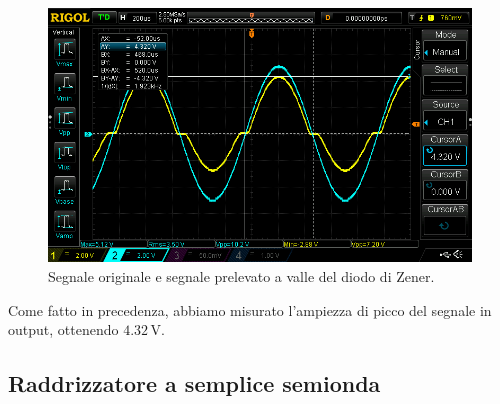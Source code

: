 \documentclass[a4paper]{article}
\begin{document}
				\begin{figure}[h!]
					\centering
					\includegraphics[scale=0.5]{ampiezzaDiPiccoDiodoDiZener}
					\caption{Segnale originale e segnale prelevato a valle del diodo di Zener.}
					\label{fig:ampiezzaDiPiccoDiodoDiZener}
				\end{figure}
				\newline
				Come fatto in precedenza, abbiamo misurato l'ampiezza di picco del segnale in output, ottenendo $ 4.32 \, \mathrm{V} $.
		\subsection{Raddrizzatore a semplice semionda}
\end{document}
